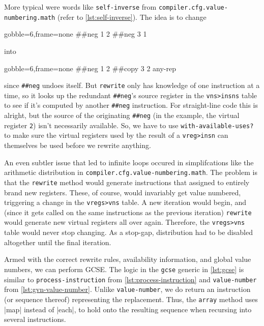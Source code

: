 \begin{sloppypar}
More typical were words like \Verb|self-inverse| from
\Verb|compiler.cfg.value-numbering.math| (refer to \cref{lst:self-inverse}).
The idea is to change
%
\begin{center}
  \begin{minipage}{0.2\linewidth}
    \begin{factorcode*}{gobble=6,frame=none}
      ##neg 1 2
      ##neg 3 1
    \end{factorcode*}
  \end{minipage}
\end{center}
%
\noindent into
%
\begin{center}
  \begin{minipage}{0.2\linewidth}
    \begin{factorcode*}{gobble=6,frame=none}
      ##neg 1 2
      ##copy 3 2 any-rep
    \end{factorcode*}
  \end{minipage}
\end{center}
%
\noindent since \Verb|##neg| undoes itself.  But \Verb|rewrite| only has
knowledge of one instruction at a time, so it looks up the redundant
\Verb|##neg|'s source register in the \Verb|vns>insns| table to see if
it's computed by another \Verb|##neg| instruction.  For straight-line code this
is alright, but the source of the originating \Verb|##neg| (in the example, the
virtual register \Verb|2|) isn't necessarily available.  So, we have to use
\Verb|with-available-uses?| to make sure the virtual registers used by the
result of a \Verb|vreg>insn| can themselves be used before we rewrite
anything.
\end{sloppypar}

An even subtler issue that led to infinite loops occured in simplifcations like
the arithmetic distribution in \Verb|compiler.cfg.value-numbering.math|.  The
problem is that the \Verb|rewrite| method would generate instructions that
assigned to entirely brand new registers.  These, of course, would invariably
get value numbered, triggering a change in the \Verb|vregs>vns| table.  A new
iteration would begin, and (since it gets called on the same instructions as
the previous iteration) \Verb|rewrite| would generate new virtual registers
all over again.  Therefore, the \Verb|vregs>vns| table would never stop
changing.  As a stop-gap, distribution had to be disabled altogether until the
final iteration.


Armed with the correct rewrite rules, availability information, and global
value numbers, we can perform \gls{GCSE}.  The logic in the \Verb|gcse|
generic in \cref{lst:gcse} is similar to \Verb|process-instruction| from
\cref{lst:process-instruction} and \Verb|value-number| from
\cref{lst:gvn-value-number}.  Unlike \Verb|value-number|, we do return an
instruction (or sequence thereof) representing the replacement.  Thus, the
\Verb|array| method uses \factor|map| instead of \factor|each|, to hold onto
the resulting sequence when recursing into several instructions.

